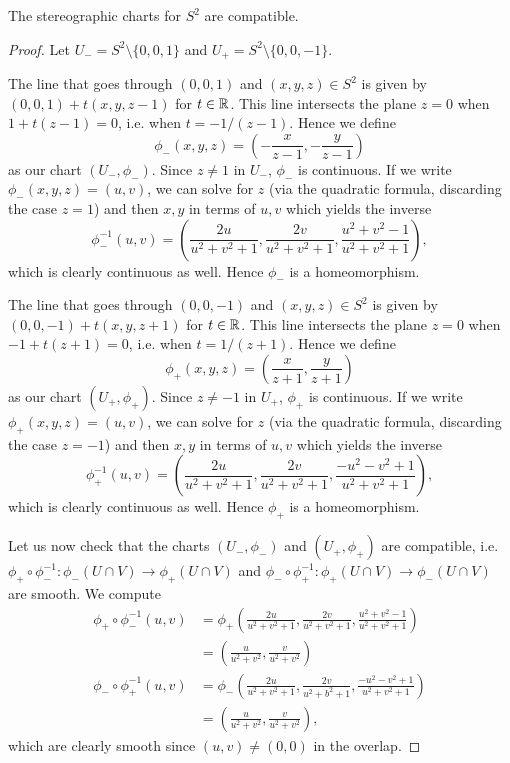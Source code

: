 \documentclass{../../mathnotes}
\begin{document}
\begin{prop}
    The stereographic charts for $S^2$ are compatible.
\end{prop}
\begin{proof}
    Let $U_-=S^2\setminus\{0,0,1\}$ and $U_+=S^2\setminus\{0,0,-1\}$.

    The line that goes through $(0,0,1)$ and $(x,y,z)\in S^2$ is given by $(0,0,1)+t(x,y,z-1)$ for $t\in\mathbb{R}$. This line intersects
    the plane $z=0$ when $1+t(z-1)=0$, i.e. when $t=-1/(z-1)$. Hence we define
    \[\phi_-(x,y,z)=\left(-\frac{x}{z-1}, -\frac{y}{z-1}\right)\]
    as our chart $(U_-,\phi_-)$. Since $z\neq 1$ in $U_-$, $\phi_-$ is continuous. If we write $\phi_-(x,y,z)=(u,v)$, we can solve
    for $z$ (via the quadratic formula, discarding the case $z=1$) and then $x,y$ in terms of $u,v$ which yields the inverse
    \[\phi_-^{-1}(u,v)=\left(\frac{2u}{u^2+v^2+1}, \frac{2v}{u^2+v^2+1}, \frac{u^2+v^2-1}{u^2+v^2+1} \right),\]
    which is clearly continuous as well. Hence $\phi_-$ is a homeomorphism.

    The line that goes through $(0,0,-1)$ and $(x,y,z)\in S^2$ is given by $(0,0,-1)+t(x,y,z+1)$ for $t\in\mathbb{R}$. This line intersects
    the plane $z=0$ when $-1+t(z+1)=0$, i.e. when $t=1/(z+1)$. Hence we define
    \[\phi_+(x,y,z)=\left(\frac{x}{z+1}, \frac{y}{z+1}\right)\]
    as our chart $(U_+,\phi_+)$. Since $z\neq -1$ in $U_+$, $\phi_+$ is continuous. If we write $\phi_+(x,y,z)=(u,v)$, we can solve
    for $z$ (via the quadratic formula, discarding the case $z=-1$) and then $x,y$ in terms of $u,v$ which yields the inverse
    \[\phi_+^{-1}(u,v)=\left(\frac{2u}{u^2+v^2+1}, \frac{2v}{u^2+v^2+1}, \frac{-u^2-v^2+1}{u^2+v^2+1} \right),\]
    which is clearly continuous as well. Hence $\phi_+$ is a homeomorphism.

    Let us now check that the charts $(U_-,\phi_-)$ and $(U_+,\phi_+)$ are compatible, i.e. $\phi_+\circ\phi_-^{-1}:\phi_-(U\cap V)\to\phi_+(U\cap V)$
    and $\phi_-\circ\phi_+^{-1}:\phi_+(U\cap V)\to\phi_-(U\cap V)$ are smooth. We compute
    \begin{align*}
        \phi_+\circ\phi_-^{-1}(u,v)&=\phi_+\left( \frac{2u}{u^2+v^2+1},\frac{2v}{u^2+v^2+1},\frac{u^2+v^2-1}{u^2+v^2+1} \right)\\
        &=\left( \frac{u}{u^2+v^2}, \frac{v}{u^2+v^2} \right)\\
        \phi_-\circ\phi_+^{-1}(u,v)&=\phi_-\left( \frac{2u}{u^2+v^2+1},\frac{2v}{u^2+b^2+1},\frac{-u^2-v^2+1}{u^2+v^2+1} \right)\\
        &=\left( \frac{u}{u^2+v^2},\frac{v}{u^2+v^2} \right),
    \end{align*}
    which are clearly smooth since $(u,v)\neq(0,0)$ in the overlap.
\end{proof}
\end{document}

